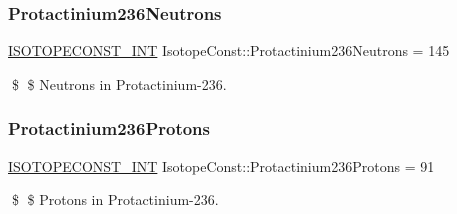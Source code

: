 \subsubsection{\texorpdfstring{Protactinium236\+Neutrons}{Protactinium236Neutrons}}
{\footnotesize\ttfamily \mbox{\hyperlink{group___isotope_const-_macros_ga5f18360b3e99483a35c32d789e62621c}{I\+S\+O\+T\+O\+P\+E\+C\+O\+N\+S\+T\+\_\+\+I\+NT}} Isotope\+Const\+::\+Protactinium236\+Neutrons = 145}

\$ \$ Neutrons in Protactinium-\/236. \mbox{\label{group___isotope_const-_protactinium-_pa236_ga92aa44adacc81a64ff1d862be79a8c70}} 
\subsubsection{\texorpdfstring{Protactinium236\+Protons}{Protactinium236Protons}}
{\footnotesize\ttfamily \mbox{\hyperlink{group___isotope_const-_macros_ga5f18360b3e99483a35c32d789e62621c}{I\+S\+O\+T\+O\+P\+E\+C\+O\+N\+S\+T\+\_\+\+I\+NT}} Isotope\+Const\+::\+Protactinium236\+Protons = 91}

\$ \$ Protons in Protactinium-\/236. 